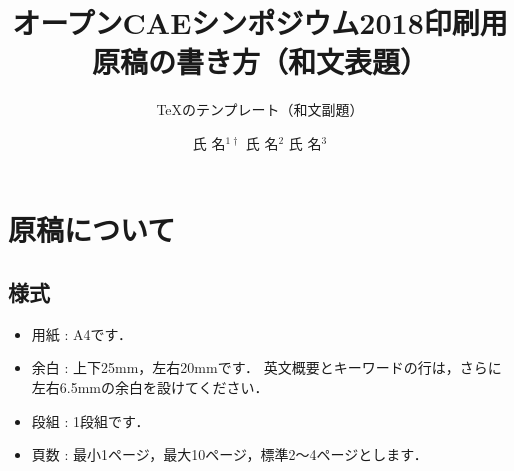 \documentclass{ltjoc}
\title{オープンCAEシンポジウム2018印刷用原稿の書き方（和文表題）}
\subtitle{\TeX のテンプレート（和文副題）}
\author{%
氏 名$^{1\dagger}$%
\hspace{1\zw}%
氏 名$^{2}$%
\hspace{1\zw}%
氏 名$^{3}$%
}
\affiliation{%
${}^{1}$所属%
\hspace{1\zw}%
${}^{2}$所属%
\hspace{1\zw}%
${}^{3}$所属%
}
\begin{document}
\maketitle
\section{原稿について}
\subsection{様式}
\begin{itemize}
\item 用紙 : A4です．
\item 余白 : 上下25mm，左右20mmです．
  英文概要とキーワードの行は，さらに左右6.5mmの余白を設けてください．
\item 段組 : 1段組です．
\item 頁数 : 最小1ページ，最大10ページ，標準2〜4ページとします．
\end{itemize}
\end{document}
